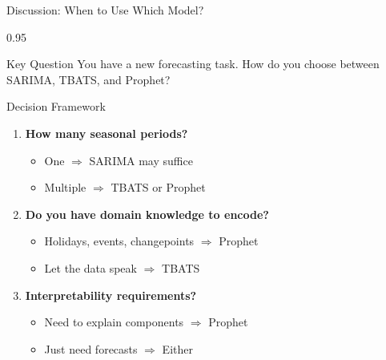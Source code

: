 \documentclass[9pt, aspectratio=169, t]{beamer}
\begin{document}
\begin{frame}{Discussion: When to Use Which Model?}
    \begin{cminipage}{0.95\textwidth}
    {\small
    \begin{alertblock}{Key Question}
        You have a new forecasting task. How do you choose between SARIMA, TBATS, and Prophet?
    \end{alertblock}
    \begin{block}{Decision Framework}
        \begin{enumerate}\setlength{\itemsep}{0pt}
            \item \textbf{How many seasonal periods?}
                \begin{itemize}\setlength{\itemsep}{0pt}
                    \item One $\Rightarrow$ SARIMA may suffice
                    \item Multiple $\Rightarrow$ TBATS or Prophet
                \end{itemize}
            \item \textbf{Do you have domain knowledge to encode?}
                \begin{itemize}\setlength{\itemsep}{0pt}
                    \item Holidays, events, changepoints $\Rightarrow$ Prophet
                    \item Let the data speak $\Rightarrow$ TBATS
                \end{itemize}
            \item \textbf{Interpretability requirements?}
                \begin{itemize}\setlength{\itemsep}{0pt}
                    \item Need to explain components $\Rightarrow$ Prophet
                    \item Just need forecasts $\Rightarrow$ Either
                \end{itemize}
        \end{enumerate}
    \end{block}
    }
    \end{cminipage}
\end{frame}
\end{document}
